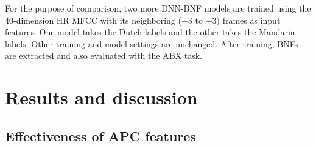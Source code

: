 \documentclass[a4paper]{article}
\begin{document}



For the purpose of   comparison, two more DNN-BNF models are  trained using the $40$-dimension HR MFCC with its neighboring ($-3$ to $+3$) frames as input features. One model takes the Dutch labels  and the other takes the Mandarin labels.
Other  training and model settings   are unchanged.
After  training, BNFs are extracted and also evaluated with the ABX task.

\section{Results and discussion}
\subsection{Effectiveness of APC features }
\label{subsec:results_apc}
\end{document}
